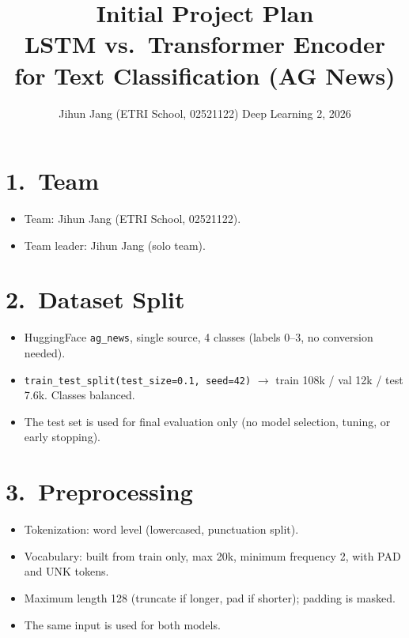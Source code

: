 \documentclass[11pt,a4paper]{article}
\title{\vspace{-1.5em}Initial Project Plan\\[2pt]
\large LSTM vs.\ Transformer Encoder for Text Classification (AG News)}
\author{Jihun Jang (ETRI School, 02521122) \quad Deep Learning 2, 2026}
\date{}
\begin{document}
\maketitle
\vspace{-1.5em}

\section*{1.\ Team}
\begin{itemize}
\item Team: Jihun Jang (ETRI School, 02521122).
\item Team leader: Jihun Jang (solo team).
\end{itemize}

\section*{2.\ Dataset Split}
\begin{itemize}
\item HuggingFace \texttt{ag\_news}, single source, 4 classes (labels 0--3, no conversion needed).
\item \texttt{train\_test\_split(test\_size=0.1, seed=42)} $\rightarrow$ train 108k / val 12k / test 7.6k. Classes balanced.
\item The test set is used for final evaluation only (no model selection, tuning, or early stopping).
\end{itemize}

\section*{3.\ Preprocessing}
\begin{itemize}
\item Tokenization: word level (lowercased, punctuation split).
\item Vocabulary: built from train only, max 20k, minimum frequency 2, with PAD and UNK tokens.
\item Maximum length 128 (truncate if longer, pad if shorter); padding is masked.
\item The same input is used for both models.
\end{itemize}
\end{document}
